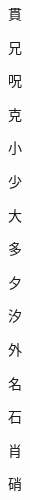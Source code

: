 \begin{spacing}{2.5}
{\Huge \begin{CJK}{UTF8}{min} 貫\end{CJK}}\hspace{0.1cm}
{\Huge \begin{CJK}{UTF8}{min} 兄\end{CJK}}\hspace{0.1cm}
{\Huge \begin{CJK}{UTF8}{min} 呪\end{CJK}}\hspace{0.1cm}
{\Huge \begin{CJK}{UTF8}{min} 克\end{CJK}}\hspace{0.1cm}
{\Huge \begin{CJK}{UTF8}{min} 小\end{CJK}}\hspace{0.1cm}
{\Huge \begin{CJK}{UTF8}{min} 少\end{CJK}}\hspace{0.1cm}
{\Huge \begin{CJK}{UTF8}{min} 大\end{CJK}}\hspace{0.1cm}
{\Huge \begin{CJK}{UTF8}{min} 多\end{CJK}}\hspace{0.1cm}
{\Huge \begin{CJK}{UTF8}{min} 夕\end{CJK}}\hspace{0.1cm}
{\Huge \begin{CJK}{UTF8}{min} 汐\end{CJK}}\hspace{0.1cm}
{\Huge \begin{CJK}{UTF8}{min} 外\end{CJK}}\hspace{0.1cm}
{\Huge \begin{CJK}{UTF8}{min} 名\end{CJK}}\hspace{0.1cm}
{\Huge \begin{CJK}{UTF8}{min} 石\end{CJK}}\hspace{0.1cm}
{\Huge \begin{CJK}{UTF8}{min} 肖\end{CJK}}\hspace{0.1cm}
{\Huge \begin{CJK}{UTF8}{min} 硝\end{CJK}}\hspace{0.1cm}

\end{spacing}
